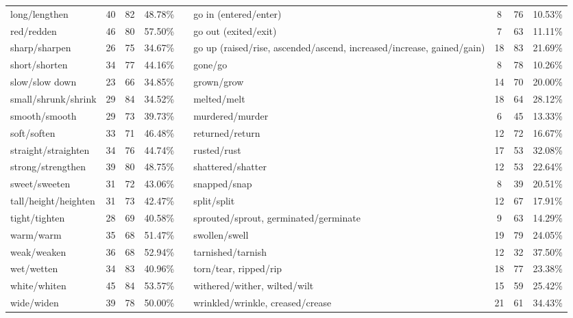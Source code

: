 \begin{tabular}{p{3cm}ccccp{3cm}ccc}
long/lengthen & 40 & 82 & 48.78\% & & go in (entered/enter) & 8 & 76 & 10.53\% \\
red/redden & 46 & 80 & 57.50\% & & go out (exited/exit) & 7 & 63 & 11.11\% \\
sharp/sharpen & 26 & 75 & 34.67\% & & go up (raised/rise, ascended/ascend, increased/increase, gained/gain) & 18 & 83 & 21.69\% \\
short/shorten & 34 & 77 & 44.16\% & & gone/go & 8 & 78 & 10.26\% \\
slow/slow down & 23 & 66 & 34.85\% & & grown/grow & 14 & 70 & 20.00\% \\
small/shrunk/shrink & 29 & 84 & 34.52\% & & melted/melt & 18 & 64 & 28.12\% \\
smooth/smooth & 29 & 73 & 39.73\% & & murdered/murder & 6 & 45 & 13.33\% \\
soft/soften & 33 & 71 & 46.48\% & & returned/return & 12 & 72 & 16.67\% \\
straight/straighten & 34 & 76 & 44.74\% & & rusted/rust & 17 & 53 & 32.08\% \\
strong/strengthen & 39 & 80 & 48.75\% & & shattered/shatter & 12 & 53 & 22.64\% \\
sweet/sweeten & 31 & 72 & 43.06\% & & snapped/snap & 8 & 39 & 20.51\% \\
tall/height/heighten & 31 & 73 & 42.47\% & & split/split & 12 & 67 & 17.91\% \\
tight/tighten & 28 & 69 & 40.58\% & & sprouted/sprout, germinated/germinate & 9 & 63 & 14.29\% \\
warm/warm & 35 & 68 & 51.47\% & & swollen/swell & 19 & 79 & 24.05\% \\
weak/weaken & 36 & 68 & 52.94\% & & tarnished/tarnish & 12 & 32 & 37.50\% \\
wet/wetten & 34 & 83 & 40.96\% & & torn/tear, ripped/rip & 18 & 77 & 23.38\% \\
white/whiten & 45 & 84 & 53.57\% & & withered/wither, wilted/wilt & 15 & 59 & 25.42\% \\
wide/widen & 39 & 78 & 50.00\% & & wrinkled/wrinkle, creased/crease & 21 & 61 & 34.43\%
\end{tabular}
